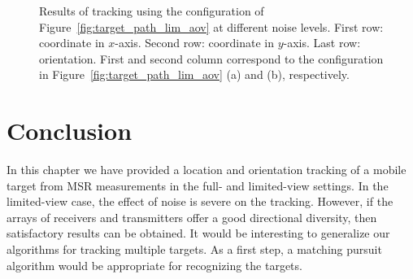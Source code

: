 \begin{figure}[htp]
  \caption{Results of tracking using the configuration of Figure~\ref{fig:target_path_lim_aov} at
    different noise levels. First row: coordinate in $x$-axis. Second row: coordinate in
    $y$-axis. Last row: orientation. First and second column correspond to the configuration in
    Figure~\ref{fig:target_path_lim_aov} (a) and (b), respectively.}
  \label{fig:tracking_lim_aov_uni_nonuni}
\end{figure}




\section{Conclusion}
\label{sec:conclusion}

In this chapter we have provided a location and orientation tracking
of a mobile target from MSR measurements in the full- and
limited-view settings. In the limited-view case, the effect of noise is severe on
the tracking. However, if the arrays of receivers and transmitters
offer a good directional diversity, then satisfactory results can
be obtained. It would be interesting to generalize our algorithms
for tracking multiple targets. As a first step, a matching pursuit
algorithm \cite{mallat1999wavelet} would be appropriate for recognizing the
targets.
